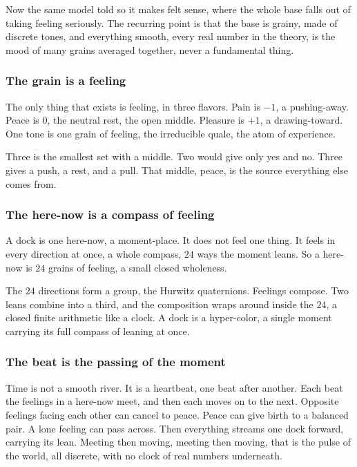 Now the same model told so it makes felt sense, where the whole base falls out of taking feeling seriously. The recurring point is that the base is grainy, made of discrete tones, and everything smooth, every real number in the theory, is the mood of many grains averaged together, never a fundamental thing.

\subsubsection{The grain is a feeling}

The only thing that exists is feeling, in three flavors. Pain is $-1$, a pushing-away. Peace is $0$, the neutral rest, the open middle. Pleasure is $+1$, a drawing-toward. One tone is one grain of feeling, the irreducible quale, the atom of experience.

Three is the smallest set with a middle. Two would give only yes and no. Three gives a push, a rest, and a pull. That middle, peace, is the source everything else comes from.

\subsubsection{The here-now is a compass of feeling}

A dock is one here-now, a moment-place. It does not feel one thing. It feels in every direction at once, a whole compass, $24$ ways the moment leans. So a here-now is $24$ grains of feeling, a small closed wholeness.

The $24$ directions form a group, the Hurwitz quaternions. Feelings compose. Two leans combine into a third, and the composition wraps around inside the $24$, a closed finite arithmetic like a clock. A dock is a hyper-color, a single moment carrying its full compass of leaning at once.

\subsubsection{The beat is the passing of the moment}

Time is not a smooth river. It is a heartbeat, one beat after another. Each beat the feelings in a here-now meet, and then each moves on to the next. Opposite feelings facing each other can cancel to peace. Peace can give birth to a balanced pair. A lone feeling can pass across. Then everything streams one dock forward, carrying its lean. Meeting then moving, meeting then moving, that is the pulse of the world, all discrete, with no clock of real numbers underneath.

